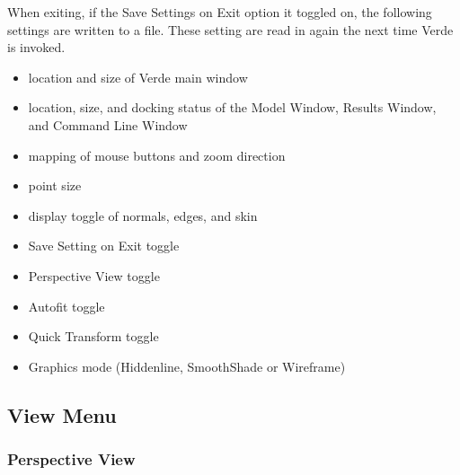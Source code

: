 \documentclass[10pt]{report}
\begin{document}
When exiting, if the Save Settings on Exit option it toggled on, the following 
settings are written to a file.  These setting are read in again the next time 
Verde is invoked.

\begin{itemize}
\item location and size of Verde main window 
\item {location, size, and docking status of the Model Window, 
       Results Window, and Command Line Window}
\item mapping of mouse buttons and zoom direction 
\item point size 
\item display toggle of normals, edges, and skin 
\item Save Setting on Exit toggle 
\item Perspective View toggle 
\item Autofit toggle  
\item Quick Transform toggle
\item Graphics mode (Hiddenline, SmoothShade or Wireframe) 
\end{itemize}


\subsection{View Menu}
\label{view_menu}

\subsubsection{Perspective View}
\label{perspective_menu}
\end{document}
